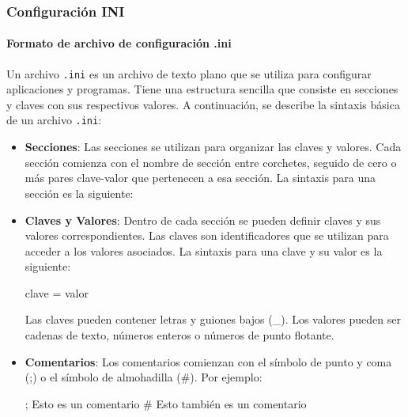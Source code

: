 \documentclass[english,spanish,a4paper,11pt]{article}
\begin{document}
\subsubsection{Configuración INI}
\label{sec:linuxcnc_configuration_ini}

\paragraph{Formato de archivo de configuración .ini}\hfill\medskip

Un archivo \texttt{.ini} es un archivo de texto plano que se utiliza para configurar aplicaciones y programas. Tiene una estructura sencilla que consiste en secciones y claves con sus respectivos valores. A continuación, se describe la sintaxis básica de un archivo \texttt{.ini}:

\begin{itemize}
    \item \textbf{Secciones}:
    Las secciones se utilizan para organizar las claves y valores. Cada sección comienza con el nombre de sección entre corchetes, seguido de cero o más pares clave-valor que pertenecen a esa sección. La sintaxis para una sección es la siguiente:

\begin{listingbox}
\end{listingbox}

    \item \textbf{Claves y Valores}:
    Dentro de cada sección se pueden definir claves y sus valores correspondientes. Las claves son identificadores que se utilizan para acceder a los valores asociados. La sintaxis para una clave y su valor es la siguiente:

\begin{listingbox}[][language=ini]
clave = valor
\end{listingbox}

    Las claves pueden contener letras y guiones bajos (\_). Los valores pueden ser cadenas de texto, números enteros o números de punto flotante.

    \item \textbf{Comentarios}:
    Los comentarios comienzan con el símbolo de punto y coma (;) o el símbolo de almohadilla (\#). Por ejemplo:

\begin{listingbox}[][language=ini]
; Esto es un comentario
# Esto también es un comentario
\end{listingbox}
\end{itemize}
\end{document}
